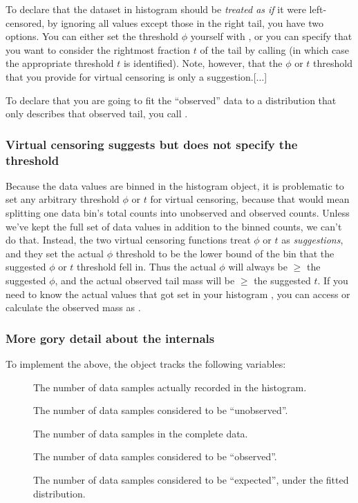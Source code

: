 To declare that the dataset in histogram  should be
\emph{treated as if} it were left-censored, by ignoring all values
except those in the right tail, you have two options. You can either
set the threshold $\phi$ yourself with
, or you can specify
that you want to consider the rightmost fraction $t$ of the tail by
calling  (in which case
the appropriate threshold $t$ is identified). Note, however, that the
$\phi$ or $t$ threshold that you provide for virtual censoring is only
a suggestion.[...]

To declare that you are going to fit the ``observed'' data to a
distribution that only describes that observed tail, you call
.

\subsubsection{Virtual censoring suggests but does not specify the threshold}

Because the data values are binned in the histogram object, it is
problematic to set any arbitrary threshold $\phi$ or $t$ for virtual
censoring, because that would mean splitting one data bin's total
counts into unobserved and observed counts. Unless we've kept the full
set of data values in addition to the binned counts, we can't do
that. Instead, the two virtual censoring functions treat $\phi$ or $t$
as \emph{suggestions}, and they set the actual $\phi$ threshold to be
the lower bound of the bin that the suggested $\phi$ or $t$ threshold
fell in. Thus the actual $\phi$ will always be $\geq$ the suggested
$\phi$, and the actual observed tail mass will be $\geq$ the suggested
$t$. If you need to know the actual values that got set in your
histogram , you can access  or calculate the
observed mass as .

\subsubsection{More gory detail about the internals}

To implement the above, the  object tracks the
following variables:

\begin{description}
\item[]  The number of data samples actually recorded in the histogram.
\item[]  The number of data samples considered to be ``unobserved''.
\item[] The number of data samples in the complete data.
\item[] The number of data samples considered to be ``observed''.
\item[] The number of data samples considered to be ``expected'', under 
                   the fitted distribution.
\end{description}

